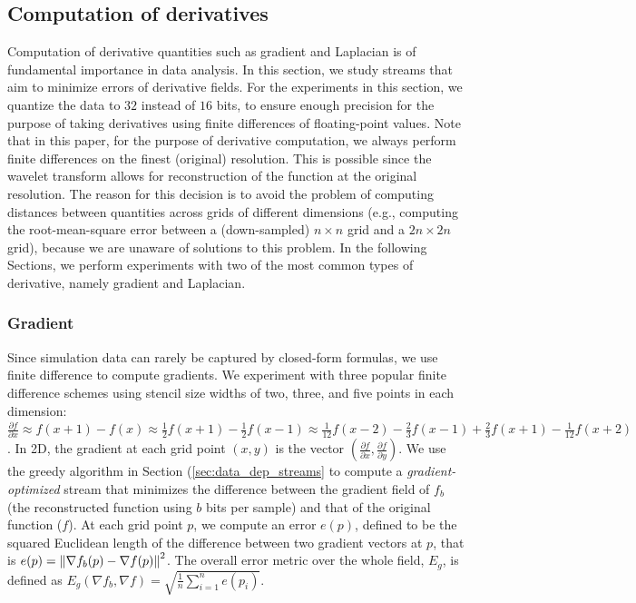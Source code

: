 \subsection{Computation of derivatives}
\label{sec:derivatives}

Computation of derivative quantities such as gradient and Laplacian is of fundamental importance in
data analysis. In this section, we study streams that aim to minimize errors of derivative fields.
For the experiments in this section, we quantize the data to $32$ instead of $16$ bits, to ensure
enough precision for the purpose of taking derivatives using finite differences of floating-point
values. Note that in this paper, for the purpose of derivative computation, we always perform finite
differences on the finest (original) resolution. This is possible since the wavelet transform allows
for reconstruction of the function at the original resolution. The reason for this decision is to
avoid the problem of computing distances between quantities across grids of different dimensions
(e.g., computing the root-mean-square error between a (down-sampled) $n\times n$ grid and a
$2n\times 2n$ grid), because we are unaware of solutions to this problem. In the following Sections,
we perform experiments with two of the most common types of derivative, namely gradient and
Laplacian.

\subsubsection{Gradient}

Since simulation data can rarely be captured by closed-form formulas, we use finite difference to
compute gradients. We experiment with three popular finite difference schemes using stencil size
widths of two, three, and five points in each dimension: $\frac{\partial f}{\partial x}\approx
f(x+1)-f(x)
\approx \frac{1}{2}f(x+1)-\frac{1}{2}f(x-1) \approx
\frac{1}{12}f(x-2)-\frac{2}{3}f(x-1)+\frac{2}{3}f(x+1)-\frac{1}{12}f(x+2)$. In 2D, the gradient at
each grid point $(x,y)$ is the vector $(\frac{\partial f}{\partial x},\frac{\partial f}{\partial
y})$. We use the greedy algorithm in Section (\ref{sec:data_dep_streams} to compute a
\emph{gradient-optimized} stream that minimizes the difference between the gradient field of $f_b$
(the reconstructed function using $b$ bits per sample) and that of the original function ($f$). At
each grid point $p$, we compute an error $e(p)$, defined to be the squared Euclidean length of the
difference between two gradient vectors at $p$, that is $e(p)=\left\lVert\nabla f_b(p)-\nabla f(p)\right\rVert^2$.
The overall error metric over the whole field, $E_g$, is defined as $E_g(\nabla f_b,\nabla
f)=\sqrt{\frac{1}{n}\sum_{i=1}^{n}{e(p_i)}}$.

